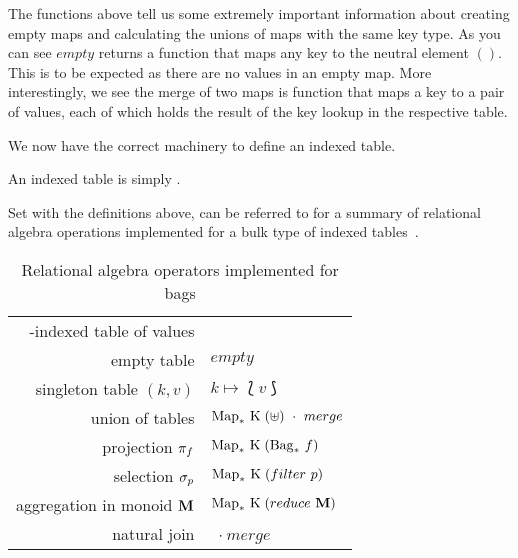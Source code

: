 The functions above tell us some extremely important information about creating
empty maps and calculating the unions of maps with the same key type. As you can see $empty$ returns a
function that maps any key to the neutral element $()$. This is to be expected
as there are no values in an empty map. More interestingly, we see the merge
of two maps is function that maps a key to a pair of
values, each of which holds the result of the key lookup in the respective
table.

We now have the correct machinery to define an indexed table.

\begin{indexedtabledef}
    An indexed table \indexedTable{\keyset}{\valset} is simply .
\end{indexedtabledef}

Set with the definitions above,  can be referred
to for a summary of relational algebra operations implemented for a bulk type of
indexed tables~\cite{RelationalAlgebraByWayOfAdjunctions}.

\begin{table}[h]
    \centering
    \begin{tabular}{r|l}
        \keyset{}-indexed table of \valset{} values & \indexedTable{\keyset}{\valset} \\
        empty table & $empty$ \\
        singleton table $(k, v)$ & $k \mapsto \lbag v \rbag$ \\
        union of tables & $\finitemap{\keyset}{(\uplus)}\ \cdot\ merge$ \\
        projection $\pi_{f}$ & $\mathrm{Map}_*\ \mathrm{K}\;(\mathrm{Bag}_*\ f)$ \\
        selection $\sigma_{p}$ & $\mathrm{Map}_*\ \mathrm{K}\;(filter\ p)$ \\
        aggregation in monoid $\mathrm{\textbf{M}}$ & $\mathrm{Map}_*\ \mathrm{K}\;(reduce\
        \mathrm{\textbf{M}})$\\
            natural join & \finitemap{\keyset}{(\times)}\ $\cdot\ merge$ \\
    \end{tabular}
    \caption{Relational algebra operators implemented for bags}
    \label{tab:BagRelAlgOps}
\end{table}
